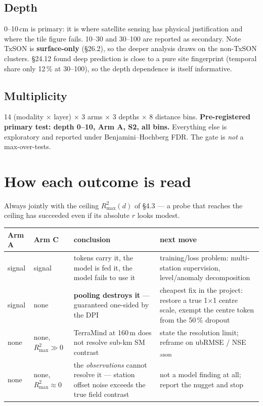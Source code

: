 \documentclass[11pt,a4paper]{article}
\begin{document}
\subsection{Depth}

0--10\,cm is primary: it is where satellite sensing has physical justification and where
the tile figure fails. 10--30 and 30--100 are reported as secondary. Note TxSON is
\textbf{surface-only} (\S26.2), so the deeper analysis draws on the non-TxSON clusters.
\S24.12 found deep prediction is close to a pure site fingerprint (temporal share only
12\,\% at 30--100), so the depth dependence is itself informative.

\subsection{Multiplicity}

14 (modality $\times$ layer) $\times$ 3 arms $\times$ 3 depths $\times$ 8 distance bins.
\textbf{Pre-registered primary test: depth 0--10, Arm A, S2, all bins.} Everything else is
exploratory and reported under Benjamini--Hochberg FDR. The gate is \emph{not} a
max-over-tests.

\section{How each outcome is read}

Always jointly with the ceiling $R^2_{\max}(d)$ of \S4.3 --- a probe that reaches the
ceiling has succeeded even if its absolute $r$ looks modest.

\begin{table}[h]
\centering\small
\begin{tabular}{@{}llp{52mm}p{52mm}@{}}
\toprule
Arm A & Arm C & conclusion & next move \\
\midrule
signal & signal & tokens carry it, the model is fed it, the model fails to use it
       & training/loss problem: multi-station supervision, level/anomaly decomposition \\[1mm]
signal & none   & \textbf{pooling destroys it} --- guaranteed one-sided by the DPI
       & cheapest fix in the project: restore a true 1$\times$1 centre scale, exempt the
         centre token from the 50\,\% dropout \\[1mm]
none   & none, $R^2_{\max}\!\gg\!0$ & TerraMind at 160\,m does not resolve sub-km SM contrast
       & state the resolution limit; reframe on ubRMSE / NSE$_{\text{anom}}$ \\[1mm]
none   & none, $R^2_{\max}\!\approx\!0$ & the \emph{observations} cannot resolve it ---
         station offset noise exceeds the true field contrast
       & not a model finding at all; report the nugget and stop \\
\bottomrule
\end{tabular}
\end{table}
\end{document}

